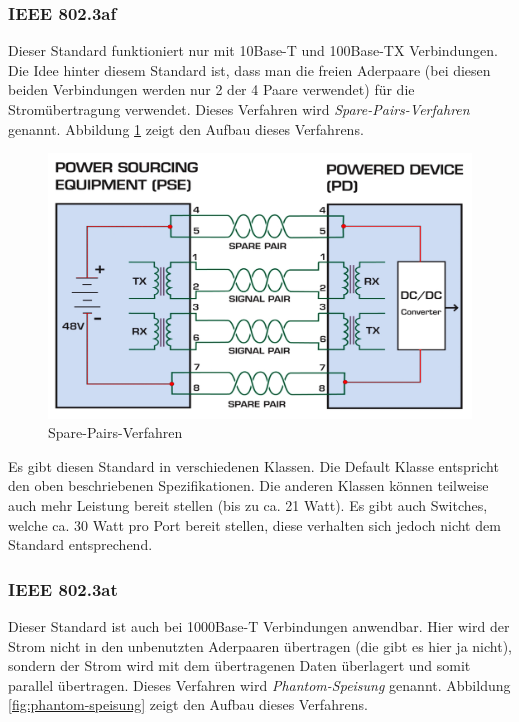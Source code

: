 \subsubsection{IEEE 802.3af}
Dieser Standard funktioniert nur mit 10Base-T und 100Base-TX Verbindungen. Die Idee hinter diesem Standard ist, dass man die freien Aderpaare (bei diesen beiden Verbindungen werden nur 2 der 4 Paare verwendet) für die Stromübertragung verwendet. Dieses Verfahren wird \emph{Spare-Pairs-Verfahren} genannt. Abbildung \ref{fig:spare-pairs} zeigt den Aufbau dieses Verfahrens.

\begin{figure}[h]
    \centering
    \leavevmode
    \includegraphics[width=1.0\linewidth]{figures/spare-pairs-verfahren-marked}
    \caption{Spare-Pairs-Verfahren\cite{poe1}}
    \label{fig:spare-pairs}
\end{figure}

Es gibt diesen Standard in verschiedenen Klassen. Die Default Klasse entspricht den oben beschriebenen Spezifikationen. Die anderen Klassen können teilweise auch mehr Leistung bereit stellen (bis zu ca. 21 Watt). Es gibt auch Switches, welche ca. 30 Watt pro Port bereit stellen, diese verhalten sich jedoch nicht dem Standard entsprechend.

\subsubsection{IEEE 802.3at}
Dieser Standard ist auch bei 1000Base-T Verbindungen anwendbar. Hier wird der Strom nicht in den unbenutzten Aderpaaren übertragen (die gibt es hier ja nicht), sondern der Strom wird mit dem übertragenen Daten überlagert und somit parallel übertragen. Dieses Verfahren wird \emph{Phantom-Speisung} genannt. Abbildung \ref{fig:phantom-speisung} zeigt den Aufbau dieses Verfahrens.

